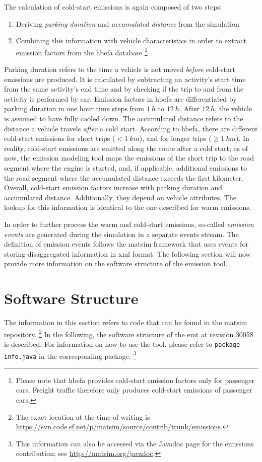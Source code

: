 The calculation of cold-start emissions is again composed of two steps:
%
\begin{enumerate}
 \item Deriving \emph{parking duration} and \emph{accumulated distance} 
 from the simulation
 \item Combining this information with vehicle characteristics in order to 
 extract emission factors from the \gls{hbefa} database%
 \footnote{
 Please note that \gls{hbefa} provides cold-start emission factors only for 
 passenger cars. Freight traffic therefore only produces cold-start emissions 
 of passenger cars.
 }
\end{enumerate}
%
Parking duration refers to the time a vehicle is not moved \emph{before} 
cold-start emissions are produced. It is calculated by subtracting an 
activity's start time from the same activity's end time and by checking if the 
trip to and from the activity is performed by car. Emission factors in 
\gls{hbefa} 
are differentiated by parking duration in one hour time steps from $1~h$ to 
$12~h$. After $12~h$, the vehicle is assumed to have fully cooled down.
%
The accumulated distance refers to the distance a vehicle travels \emph{after} 
a cold start. According to \gls{hbefa}, there are different cold-start 
emissions for short trips ($<1~km$), and for longer trips ($\geq 1~km$).
%
In reality, cold-start emissions are emitted along the route after a cold start;
as of now, the emission modeling tool maps the emissions of the short trip to the road
segment where the engine is started, and, if applicable, additional emissions
to the road segment where the accumulated distance exceeds the first kilometer.
%
Overall, cold-start emission factors increase with parking duration and 
accumulated distance. Additionally, they depend on vehicle attributes. The 
lookup for this information is identical to the one described for warm 
emissions.

In order to further process the warm and cold-start emissions, so-called 
\emph{emission events} are generated during the simulation in a separate 
events stream. The definition of emission events follows the \gls{matsim} 
framework that uses events for storing disaggregated information in 
\acrshort{xml} format. The following section will now provide more information 
on the software structure of the emission tool.

\section{Software Structure}
\label{ch:emissions:structure}
The information in this section refers to code that can be found in the 
\gls{matsim} repository.%
%
\footnote{
%
The exact location at the time of writing is 
\url{https://svn.code.sf.net/p/matsim/source/contrib/trunk/emissions}.
%
}
In the following, the software structure of the \gls{emt} at 
revision 30058 is described. For information on how to use the tool, please 
refer to \texttt{package-info.java} in the corresponding package.%
%
\footnote{
%
This information can also be accessed via the Javadoc page for the emissions contribution; see \url{http://matsim.org/javadoc}.
%
}
%

